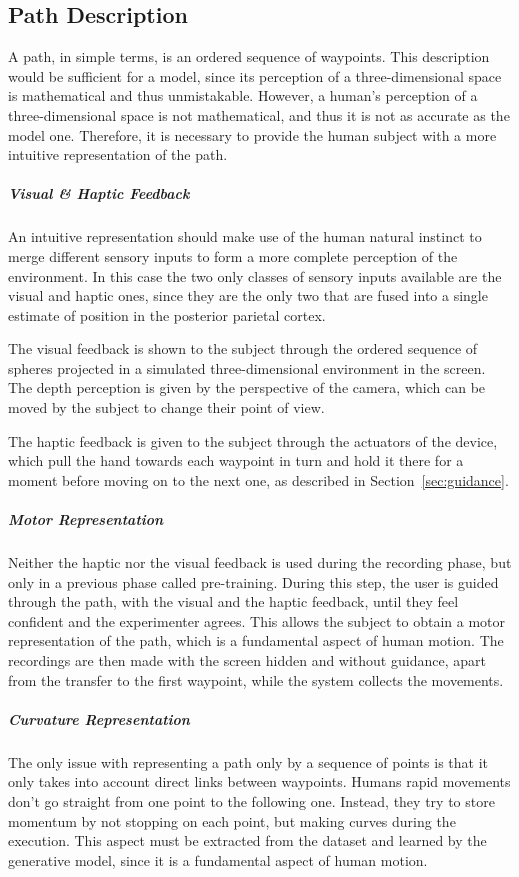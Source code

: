 \documentclass[12pt]{report}
\begin{document}
\subsection{Path Description}
\label{sec:path_description}
A path, in simple terms, is an ordered sequence of waypoints. This description would be sufficient for a model, since its perception of a three-dimensional space is mathematical and thus unmistakable. However, a human's perception of a three-dimensional space is not mathematical, and thus it is not as accurate as the model one. Therefore, it is necessary to provide the human subject with a more intuitive representation of the path.

\subparagraph{Visual \& Haptic Feedback} An intuitive representation should make use of the human natural instinct to merge different sensory inputs to form a more complete perception of the environment. In this case the two only classes of sensory inputs available are the visual and haptic ones, since they are the only two that are fused into a single estimate of position in the posterior parietal cortex. 

The visual feedback is shown to the subject through the ordered sequence of spheres projected in a simulated three-dimensional environment in the screen. The depth perception is given by the perspective of the camera, which can be moved by the subject to change their point of view. 

The haptic feedback is given to the subject through the actuators of the device, which pull the hand towards each waypoint in turn and hold it there for a moment before moving on to the next one, as described in Section~\ref{sec:guidance}.

\subparagraph{Motor Representation} Neither the haptic nor the visual feedback is used during the recording phase, but only in a previous phase called pre-training. During this step, the user is guided through the path, with the visual and the haptic feedback, until they feel confident and the experimenter agrees. This allows the subject to obtain a motor representation of the path, which is a fundamental aspect of human motion. The recordings are then made with the screen hidden and without guidance, apart from the transfer to the first waypoint, while the system collects the movements.

\subparagraph{Curvature Representation}
The only issue with representing a path only by a sequence of points is that it only takes into account direct links between waypoints. Humans rapid movements don't go straight from one point to the following one. Instead, they try to store momentum by not stopping on each point, but making curves during the execution. This aspect must be extracted from the dataset and learned by the generative model, since it is a fundamental aspect of human motion.
\end{document}
